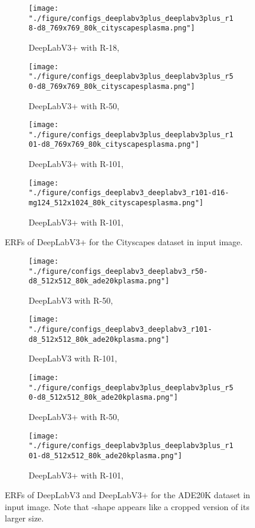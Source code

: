 \documentclass{article}
\begin{document}
\begin{figure}[t!]
	\centering
	\begin{subfigure}[b]{0.241\linewidth}
		\centering
		\texttt{[image: "./figure/configs\_deeplabv3plus\_deeplabv3plus\_r18-d8\_769x769\_80k\_cityscapesplasma.png"]}
		\caption{DeepLabV3+ with R-18, }
	\end{subfigure}
	\hfill
	\begin{subfigure}[b]{0.241\linewidth}
		\centering
		\texttt{[image: "./figure/configs\_deeplabv3plus\_deeplabv3plus\_r50-d8\_769x769\_80k\_cityscapesplasma.png"]}
		\caption{DeepLabV3+ with R-50, }
	\end{subfigure}
	\hfill
	\begin{subfigure}[b]{0.241\linewidth}
		\centering
		\texttt{[image: "./figure/configs\_deeplabv3plus\_deeplabv3plus\_r101-d8\_769x769\_80k\_cityscapesplasma.png"]}
		\caption{DeepLabV3+ with R-101, }
	\end{subfigure}
	\hfill
	\begin{subfigure}[b]{0.241\linewidth}
		\centering
		\texttt{[image: "./figure/configs\_deeplabv3\_deeplabv3\_r101-d16-mg124\_512x1024\_80k\_cityscapesplasma.png"]}
		\caption{DeepLabV3+ with R-101, }
	\end{subfigure}
	\caption{ERFs of DeepLabV3+ for the Cityscapes dataset in  input image.}
	\label{fig:d3p}
\end{figure}

\begin{figure}[t!]
	\centering
	\begin{subfigure}[b]{0.241\linewidth}
		\centering
		\texttt{[image: "./figure/configs\_deeplabv3\_deeplabv3\_r50-d8\_512x512\_80k\_ade20kplasma.png"]}
		\caption{DeepLabV3 with R-50, }
	\end{subfigure}
	\hfill
	\begin{subfigure}[b]{0.241\linewidth}
		\centering
		\texttt{[image: "./figure/configs\_deeplabv3\_deeplabv3\_r101-d8\_512x512\_80k\_ade20kplasma.png"]}
		\caption{DeepLabV3 with R-101, }
	\end{subfigure}
	\hfill
	\begin{subfigure}[b]{0.241\linewidth}
		\centering
		\texttt{[image: "./figure/configs\_deeplabv3plus\_deeplabv3plus\_r50-d8\_512x512\_80k\_ade20kplasma.png"]}
		\caption{DeepLabV3+ with R-50, }
	\end{subfigure}
	\hfill
	\begin{subfigure}[b]{0.241\linewidth}
		\centering
		\texttt{[image: "./figure/configs\_deeplabv3plus\_deeplabv3plus\_r101-d8\_512x512\_80k\_ade20kplasma.png"]}
		\caption{DeepLabV3+ with R-101, }
	\end{subfigure}
	\caption{ERFs of DeepLabV3 and DeepLabV3+ for the ADE20K dataset in  input image. Note that \EightStarTaper-shape appears like a cropped version of its larger size.}
	\label{fig:d3ade}
\end{figure}
\end{document}
